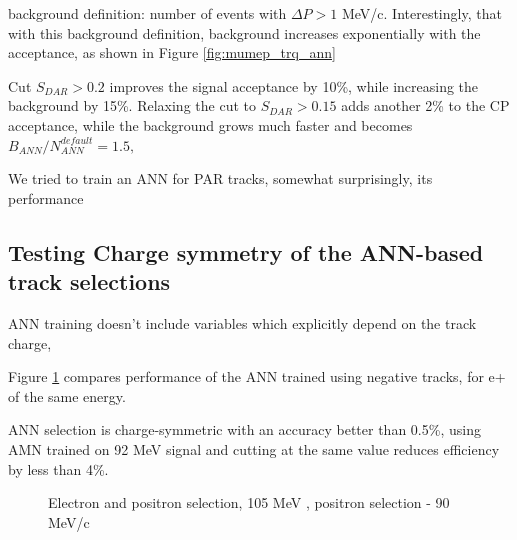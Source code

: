 background definition: number of events with $\Delta{P} > 1$ MeV/c.
Interestingly, that with this background definition, background increases exponentially with the acceptance, 
as shown in Figure \ref{fig:mumep_trq_ann}

Cut $S_{DAR} > 0.2$ improves the signal acceptance by 10\%, while increasing the background by 15\%.
Relaxing the cut to $S_{DAR} > 0.15$ adds another 2\% to the CP acceptance, while the background grows 
much faster and becomes $B_{ANN}/N_{ANN}^{default} = 1.5,$

We tried to train an ANN for PAR tracks, somewhat surprisingly, its performance 

\subsection{Testing Charge symmetry of the ANN-based track selections}

ANN training doesn't include variables which explicitly depend on the track charge, 

Figure \ref{fig:su2020_mva_test_dar} compares performance of the ANN trained using 
negative tracks, for e+ of the same energy.

ANN selection is charge-symmetric with an accuracy better than 0.5\%, using AMN trained on 
92 MeV signal and cutting at the same value reduces efficiency by less than 4\%.

\begin{figure}
  \caption{
    \label{fig:su2020_mva_test_dar} 
    Electron and positron selection, 105 MeV , positron selection - 90 MeV/c
  }
\end{figure}

